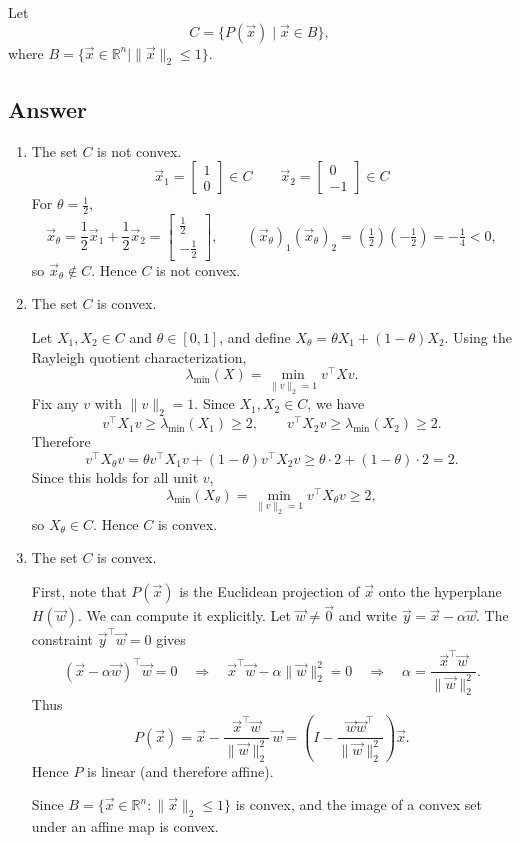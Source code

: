 \documentclass[
  12pt,
]{fphw}
\begin{document}
Let
\[
C = \{ P(\vec{x}) \mid \vec{x} \in B \}, \tag{11}
\]
where $B = \{\vec{x} \in \mathbb{R}^n \mid \|\vec{x}\|_2 \le 1\}$.

\subsection*{Answer}

\begin{enumerate}
\item[(a)] The set $C$ is not convex.
\[
\vec{x}_1=\begin{bmatrix}1\\[2pt]0\end{bmatrix}\in C
\qquad
\vec{x}_2=\begin{bmatrix}0\\[2pt]-1\end{bmatrix}\in C
\]
For $\theta=\tfrac12$,
\[
\vec{x}_\theta=\frac12\vec{x}_1+\frac12\vec{x}_2
=\begin{bmatrix}\tfrac12\\[2pt]-\tfrac12\end{bmatrix},
\qquad
(\vec{x}_\theta)_1(\vec{x}_\theta)_2
=
\left(\tfrac12\right)\left(-\tfrac12\right)
=
-\tfrac14
<0,
\]
so $\vec{x}_\theta\notin C$. Hence $C$ is not convex.

\item[(b)] The set $C$ is convex.

Let $X_1,X_2\in C$ and $\theta\in[0,1]$, and define $X_\theta=\theta X_1+(1-\theta)X_2$.
Using the Rayleigh quotient characterization,
\[
\lambda_{\min}(X)=\min_{\|v\|_2=1} v^\top X v.
\]
Fix any $v$ with $\|v\|_2=1$. Since $X_1,X_2\in C$, we have
\[
v^\top X_1 v \ge \lambda_{\min}(X_1)\ge 2,
\qquad
v^\top X_2 v \ge \lambda_{\min}(X_2)\ge 2.
\]
Therefore
\[
v^\top X_\theta v
=
\theta v^\top X_1 v + (1-\theta) v^\top X_2 v
\ge
\theta\cdot 2 + (1-\theta)\cdot 2
=
2.
\]
Since this holds for all unit $v$,
\[
\lambda_{\min}(X_\theta)
=
\min_{\|v\|_2=1} v^\top X_\theta v
\ge 2,
\]
so $X_\theta\in C$. Hence $C$ is convex.

\item[(c)] The set $C$ is convex.

First, note that $P(\vec{x})$ is the Euclidean projection of $\vec{x}$ onto the hyperplane $H(\vec{w})$.
We can compute it explicitly. Let $\vec{w}\neq \vec{0}$ and write $\vec{y}=\vec{x}-\alpha \vec{w}$.
The constraint $\vec{y}^\top \vec{w}=0$ gives
\[
(\vec{x}-\alpha \vec{w})^\top \vec{w}=0
\quad\Longrightarrow\quad
\vec{x}^\top \vec{w}-\alpha \|\vec{w}\|_2^2=0
\quad\Longrightarrow\quad
\alpha=\frac{\vec{x}^\top \vec{w}}{\|\vec{w}\|_2^2}.
\]
Thus
\[
P(\vec{x})
=
\vec{x}-\frac{\vec{x}^\top \vec{w}}{\|\vec{w}\|_2^2}\,\vec{w}
=
\left(I-\frac{\vec{w}\vec{w}^\top}{\|\vec{w}\|_2^2}\right)\vec{x}.
\]
Hence $P$ is linear (and therefore affine).

Since $B=\{\vec{x}\in\mathbb{R}^n:\|\vec{x}\|_2\le 1\}$ is convex, and the image of a convex set under an affine map is convex.
\end{enumerate}
\end{document}

